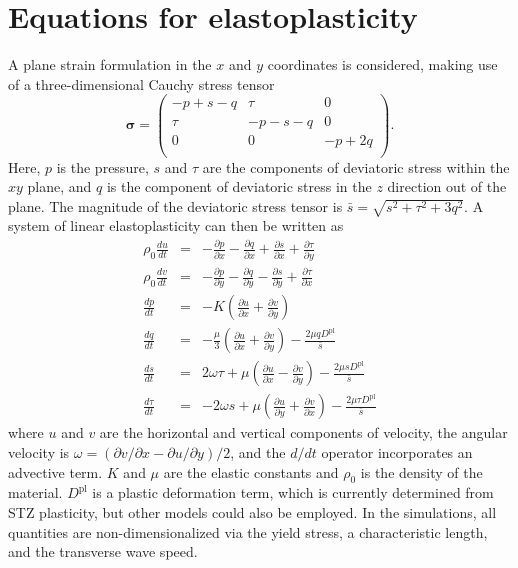 \documentclass[11pt]{article}
\newcommand{\p}{\partial}
\newcommand{\bsig}{\boldsymbol\sigma}
\newcommand{\drt}[1]{\frac{d #1}{d t}}
\newcommand{\prx}[1]{\frac{\p #1}{\p x}}
\newcommand{\pry}[1]{\frac{\p #1}{\p y}}
\newcommand{\Dpl}{D^\textrm{pl}}
\begin{document}
\section*{Equations for elastoplasticity}
A plane strain formulation in the $x$ and $y$ coordinates is considered, making
use of a three-dimensional Cauchy stress tensor
\[
\bsig = \left(
\begin{array}{ccc}
  -p + s -q & \tau & 0 \\
  \tau & -p-s-q & 0 \\
  0 & 0 & -p + 2q \\
\end{array}
\right).
\]
Here, $p$ is the pressure, $s$ and $\tau$ are the components of deviatoric
stress within the $xy$ plane, and $q$ is the component of deviatoric stress in
the $z$ direction out of the plane. The magnitude of the deviatoric stress
tensor is $\bar{s}=\sqrt{s^2+\tau^2+3q^2}$. A system of linear elastoplasticity
can then be written as
\begin{eqnarray}
  \label{eq:sys_start} \rho_0 \drt{u}&=&-\prx{p}-\prx{q}+\prx{s}+\pry{\tau} \\
  \rho_0 \drt{v}&=&-\pry{p}-\pry{q}-\pry{s}+\prx{\tau} \\
  \drt{p} &=& -K \left(\prx{u} +\pry{v}\right) \\
  \drt{q} &=& -\frac{\mu}{3} \left(\prx{u} + \pry{v}\right) -\frac{2\mu q \Dpl}{\bar{s}}\\
  \drt{s} &=& 2\omega \tau + \mu\left( \prx{u} - \pry{v} \right) - \frac{2\mu s \Dpl}{\bar{s}} \\
  \label{eq:sys_end} \drt{\tau} &=& - 2\omega s + \mu \left( \pry{u} + \prx{v} \right) - \frac{2\mu \tau \Dpl}{\bar{s}}
\end{eqnarray}
where $u$ and $v$ are the horizontal and vertical components of velocity, the
angular velocity is $\omega= (\p v /\p x - \p u / \p y)/2$, and the $d/dt$
operator incorporates an advective term. $K$ and $\mu$ are the elastic
constants and $\rho_0$ is the density of the material. $\Dpl$ is a plastic
deformation term, which is currently determined from STZ plasticity, but other
models could also be employed. In the simulations, all quantities are
non-dimensionalized via the yield stress, a characteristic length, and the
transverse wave speed.
\end{document}
